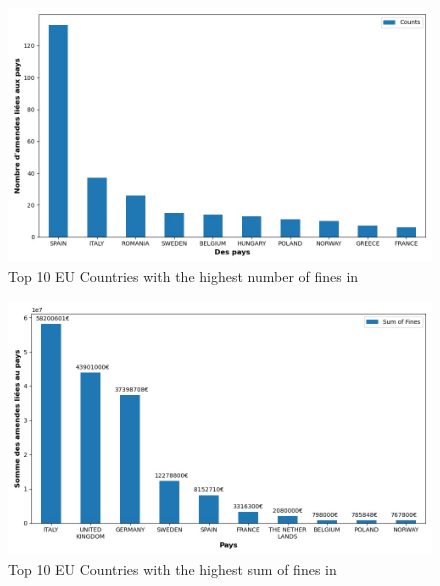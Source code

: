 \documentclass[12pt]{article}
\begin{document}
	\begin{figure}
		[H]\centering\includegraphics[scale=.5]{graphs/top10_countries_year}
		\caption{Top 10 EU Countries with the highest number of fines in }
	\end{figure}
	\begin{figure}
		[H]\centering\includegraphics[scale=.5]{graphs/top10_countries_year_fines}
		\caption{Top 10 EU Countries with the highest sum of fines in }
	\end{figure}
\end{document}
